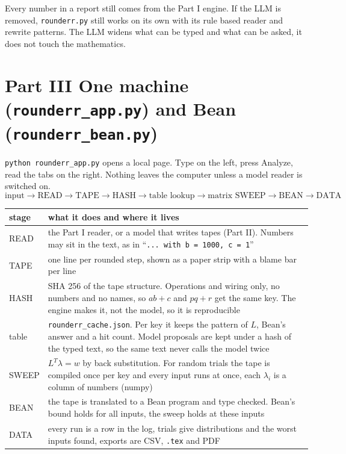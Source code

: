 \documentclass[11pt]{article}
\begin{document}
\begin{trap}
Every number in a report still comes from the Part I engine. If the LLM is removed, \texttt{rounderr.py} still works on its own with its rule based reader and rewrite patterns. The LLM widens what can be typed and what can be asked, it does not touch the mathematics.
\end{trap}


\clearpage
\section*{Part III \quad One machine (\texttt{rounderr\_app.py}) and Bean (\texttt{rounderr\_bean.py})}

\begin{idea}
\texttt{python rounderr\_app.py} opens a local page. Type on the left, press Analyze, read the tabs on the right. Nothing leaves the computer unless a model reader is switched on.
\[
\text{input} \to \text{READ} \to \text{TAPE} \to \text{HASH} \to \text{table lookup} \to \text{matrix SWEEP} \to \text{BEAN} \to \text{DATA}
\]
\end{idea}

\begin{center}
\begin{tabularx}{\textwidth}{@{}lX@{}}
\toprule
stage & what it does and where it lives \\
\midrule
READ & the Part I reader, or a model that writes tapes (Part II). Numbers may sit in the text, as in ``\texttt{... with b = 1000, c = 1}'' \\
TAPE & one line per rounded step, shown as a paper strip with a blame bar per line \\
HASH & SHA 256 of the tape structure. Operations and wiring only, no numbers and no names, so $ab + c$ and $pq + r$ get the same key. The engine makes it, not the model, so it is reproducible \\
table & \texttt{rounderr\_cache.json}. Per key it keeps the pattern of $L$, Bean's answer and a hit count. Model proposals are kept under a hash of the typed text, so the same text never calls the model twice \\
SWEEP & $L^{T}\lambda = w$ by back substitution. For random trials the tape is compiled once per key and every input runs at once, each $\lambda_i$ is a column of numbers (numpy) \\
BEAN & the tape is translated to a Bean program and type checked. Bean's bound holds for all inputs, the sweep holds at these inputs \\
DATA & every run is a row in the log, trials give distributions and the worst inputs found, exports are CSV, \texttt{.tex} and PDF \\
\bottomrule
\end{tabularx}
\end{center}
\end{document}
